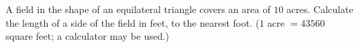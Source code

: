 A field in the shape of an equilateral triangle covers an area of $10$ acres. Calculate the length of a side of the field in feet, to the nearest foot. ($1$ acre $=43560$ square feet; a calculator may be used.)
